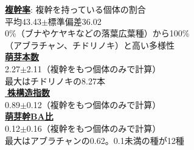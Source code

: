 \documentclass[a0, 30pt, plainboxedsections, draft]{sciposter} %
\renewcommand{\baselinestretch}{1.2}
\begin{document}
\begin{multicols}{2}

\begin{mdframed}[style=subsection.frame,frametitle={\textbf{\huge{\ding{192}}\LARGE{25種の株構造は種間で大きく異なる}}}]
\renewcommand{\baselinestretch}{1.2}

\begin{figure}
 \begin{minipage}{0.5\hsize}
\textbf{\underline{複幹率}}{\footnotesize: 複幹を持っている個体の割合}\\平均43.43$\pm$標準偏差36.02\\
{\scriptsize 0\%（ブナやケヤキなどの落葉広葉種）から100\%\\（アブラチャン、チドリノキ）と高い多様性}\\
\textbf{\underline{萌芽本数}}\\2.27$\pm$2.11{\footnotesize（複幹をもつ個体のみで計算）}\\
{\scriptsize 最大はチドリノキの8.27本}\\
\textbf{\underline{株構造指数}}\\0.89$\pm$0.12{\footnotesize（複幹をもつ個体のみで計算）}\\
\textbf{\underline{萌芽幹BA比}}\\0.12$\pm$0.16{\footnotesize（複幹をもつ個体のみで計算）}\\
{\scriptsize 最大はアブラチャンの0.62。0.1未満の種が12種}


\end{minipage}
\end{figure}
\end{mdframed}
\end{multicols}
\end{document}
